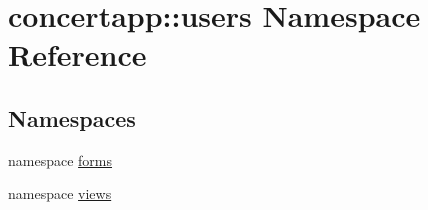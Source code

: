 \hypertarget{namespaceconcertapp_1_1users}{
\section{concertapp::users Namespace Reference}
\label{namespaceconcertapp_1_1users}
}
\subsection*{Namespaces}
\begin{DoxyCompactItemize}
\item 
namespace \hyperlink{namespaceconcertapp_1_1users_1_1forms}{forms}
\item 
namespace \hyperlink{namespaceconcertapp_1_1users_1_1views}{views}
\end{DoxyCompactItemize}
